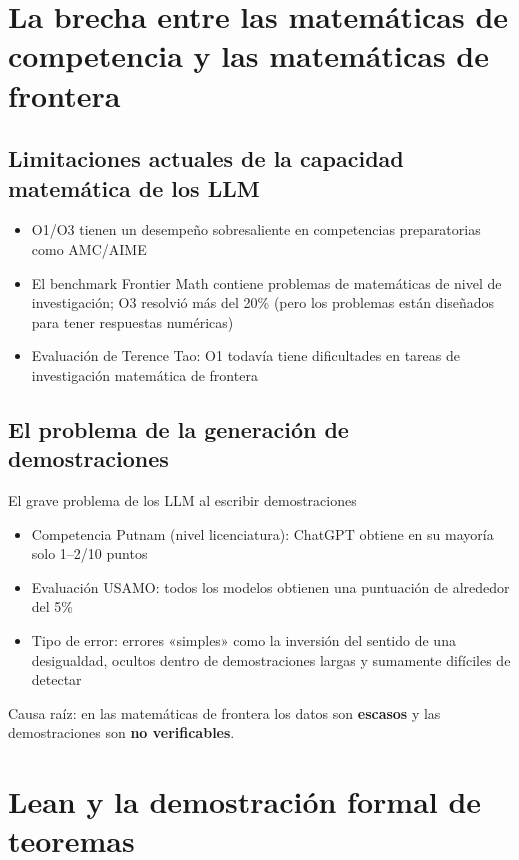 \documentclass[a4paper]{article}
\begin{document}
\section{La brecha entre las matemáticas de competencia y las matemáticas de frontera}

\subsection{Limitaciones actuales de la capacidad matemática de los LLM}

\begin{itemize}
    \item O1/O3 tienen un desempeño sobresaliente en competencias preparatorias como AMC/AIME
    \item El benchmark Frontier Math contiene problemas de matemáticas de nivel de investigación; O3 resolvió más del 20\% (pero los problemas están diseñados para tener respuestas numéricas)
    \item Evaluación de Terence Tao: O1 todavía tiene dificultades en tareas de investigación matemática de frontera
\end{itemize}

\subsection{El problema de la generación de demostraciones}

\begin{warningbox}{El grave problema de los LLM al escribir demostraciones}
\begin{itemize}
    \item Competencia Putnam (nivel licenciatura): ChatGPT obtiene en su mayoría solo 1--2/10 puntos
    \item Evaluación USAMO: todos los modelos obtienen una puntuación de alrededor del 5\%
    \item Tipo de error: errores «simples» como la inversión del sentido de una desigualdad, ocultos dentro de demostraciones largas y sumamente difíciles de detectar
\end{itemize}
Causa raíz: en las matemáticas de frontera los datos son \textbf{escasos} y las demostraciones son \textbf{no verificables}.
\end{warningbox}

\section{Lean y la demostración formal de teoremas}
\end{document}
